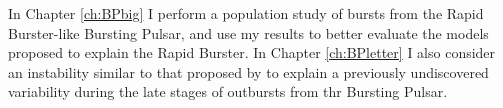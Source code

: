 \par In Chapter \ref{ch:BPbig} I perform a population study of bursts from the Rapid Burster-like Bursting Pulsar, and use my results to better evaluate the models proposed to explain the Rapid Burster.  In Chapter \ref{ch:BPletter} I also consider an instability similar to that proposed by \citet{Spruit_Type2Mod} to explain a previously undiscovered variability during the late stages of outbursts from thr Bursting Pulsar.